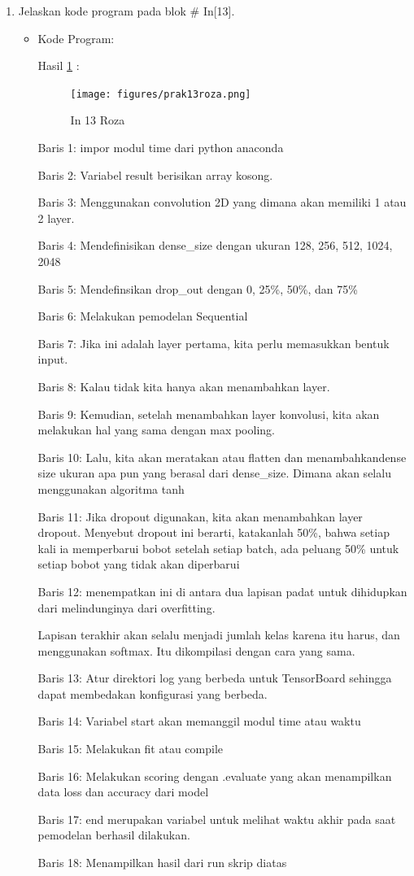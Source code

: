 \begin{enumerate}
\item Jelaskan kode program pada blok \# In[13].
\begin{itemize}
\item Kode Program:

\par Hasil \ref{in13roza} :
\begin{figure}[!hbtp]
\centering
\texttt{[image: figures/prak13roza.png]}
\caption{In 13 Roza}
\label{in13roza}
\end{figure}
\par Baris 1: impor modul time dari python anaconda
\par Baris 2: Variabel result berisikan array kosong.
\par Baris 3: Menggunakan convolution 2D yang dimana akan memiliki 1 atau 2 layer.
\par Baris 4: Mendefinisikan dense\_size dengan ukuran 128, 256, 512, 1024, 2048
\par Baris 5: Mendefinsikan drop\_out dengan 0, 25\%, 50\%, dan 75\%
\par Baris 6:  Melakukan pemodelan Sequential
\par Baris 7: Jika ini adalah layer pertama, kita perlu memasukkan bentuk input.
\par Baris 8: Kalau tidak kita hanya akan menambahkan layer.
\par Baris 9: Kemudian, setelah menambahkan layer konvolusi, kita akan melakukan hal yang sama dengan max pooling.
\par Baris 10: Lalu, kita akan meratakan atau flatten dan menambahkandense size ukuran apa pun yang berasal dari dense\_size. Dimana akan selalu menggunakan algoritma tanh
\par Baris 11: Jika dropout digunakan, kita akan menambahkan layer dropout. Menyebut dropout ini berarti, katakanlah 50\%, bahwa setiap kali ia memperbarui bobot setelah setiap batch, ada peluang 50\% untuk setiap bobot yang tidak akan diperbarui
\par Baris 12: menempatkan ini di antara dua lapisan padat untuk dihidupkan dari melindunginya dari overfitting.
\par Lapisan terakhir akan selalu menjadi jumlah kelas karena itu harus, dan menggunakan softmax. Itu dikompilasi dengan cara yang sama.
\par Baris 13: Atur direktori log yang berbeda untuk TensorBoard sehingga dapat membedakan konfigurasi yang berbeda.
\par Baris 14: Variabel start akan memanggil modul time atau waktu
\par Baris 15: Melakukan fit atau compile 
\par Baris 16: Melakukan scoring dengan .evaluate yang akan menampilkan data loss dan accuracy dari model
\par Baris 17:  end merupakan variabel untuk melihat waktu akhir pada saat pemodelan berhasil dilakukan.
\par Baris 18:  Menampilkan hasil dari run skrip diatas 
\end{itemize}
\par


\end{enumerate}
